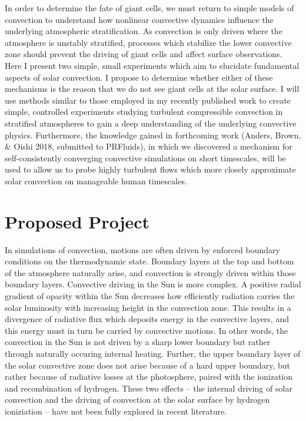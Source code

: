 \documentclass[aasms,12pt]{article}
\begin{document}
In order to determine the fate of giant cells, we must return to simple models of convection to
understand how nonlinear convective dynamics influence the underlying atmospheric stratification.
As convection is only driven where the atmosphere is unstably stratified, processes which stabilize the lower convective
zone should prevent the driving of giant cells and affect surface observations.
Here I present two simple, small experiments which aim to elucidate fundamental aspects of solar
convection. I propose to determine whether either of these mechanisms is the reason that we do not see giant cells
at the solar surface. I will use methods similar to those employed in my recently published work
\citep{anders&brown2017} to create simple, controlled experiments studying turbulent
compressible convection in stratified atmospheres 
to gain a deep understanding of the underlying convective physics.
Furthermore, the knowledge gained in forthcoming work (Anders, Brown, \& Oishi 2018, submitted to PRFluids),
in which we discovered a mechanism for self-consistently converging convective simulations on short timescales,
will be used to allow us to probe highly turbulent flows which more closely approximate solar convection on
manageable human timescales.

\section{Proposed Project}
In simulations of convection, motions are often driven by enforced boundary conditions
on the thermodynamic state.  Boundary layers at the top and bottom of the atmosphere naturally arise,
and convection is strongly driven within those boundary layers.  Convective driving in the Sun is more
complex. A positive radial gradient of opacity within the Sun decreases how efficiently radiation carries
the solar luminosity with increasing height in the convection zone.
This results in a divergence of radiative flux which deposits
energy in the convective layers, and this energy must in turn be carried by convective motions.
In other words, the convection in the Sun is not driven by a sharp lower boundary but rather
through naturally occuring internal heating.
Further, the upper boundary layer of the solar convective zone does not arise because of a hard
upper boundary, but rather because of radiative losses at the photosphere, paired with the ionization and 
recombination of hydrogen. These
two effects -- the internal driving of solar convection and the driving of convection at the solar surface 
by hydrogen ioniziation -- have not been fully explored in recent literature.
\end{document}
